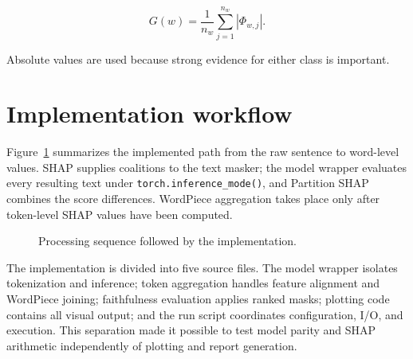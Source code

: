 \documentclass[11pt,a4paper]{article}
\begin{document}
\begin{equation}
  G(w)=\frac{1}{n_w}\sum_{j=1}^{n_w}|\Phi_{w,j}|.
  \label{eq:global-importance}
\end{equation}

Absolute values are used because strong evidence for either class is important.

\section{Implementation workflow}

Figure~\ref{fig:workflow} summarizes the implemented path from the raw sentence
to word-level values. SHAP supplies coalitions to the text masker; the model
wrapper evaluates every resulting text under \texttt{torch.inference\_mode()},
and Partition SHAP combines the score differences. WordPiece aggregation takes
place only after token-level SHAP values have been computed.

\begin{figure}[H]
  \centering
  \caption{Processing sequence followed by the implementation.}
  \label{fig:workflow}
\end{figure}

The implementation is divided into five source files. The model wrapper isolates
tokenization and inference; token aggregation handles feature alignment and
WordPiece joining; faithfulness evaluation applies ranked masks; plotting code
contains all visual output; and the run script coordinates configuration, I/O,
and execution. This separation made it possible to test model parity and SHAP
arithmetic independently of plotting and report generation.
\end{document}
